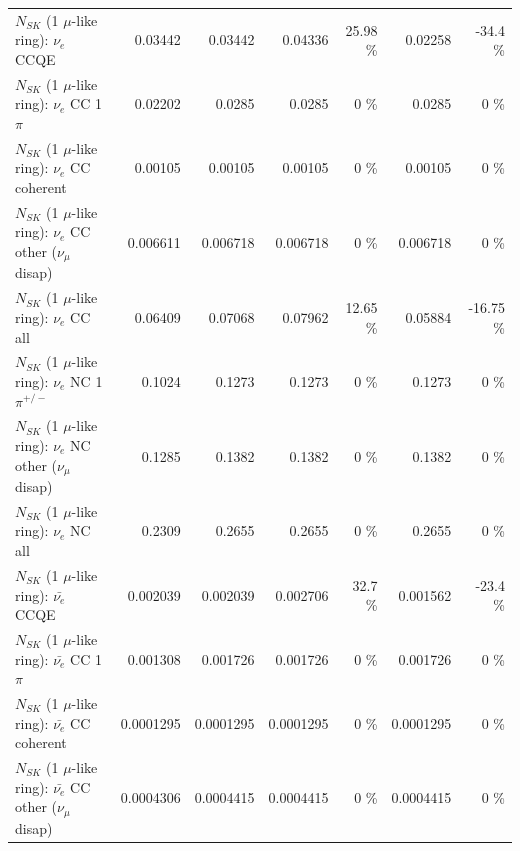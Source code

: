 \begin{table}
\begin{tabular}{| l | r | r | r  r | r  r |}
\hline
\hline
\hline
                                      $N_{SK}$ (1 $\mu$-like ring): $\nu_e$ CCQE &         0.03442 &         0.03442 &         0.04336 &    25.98 \%  &         0.02258 &    -34.4 \%  \\ 
                                 $N_{SK}$ (1 $\mu$-like ring): $\nu_e$ CC 1$\pi$ &         0.02202 &          0.0285 &          0.0285 &        0 \%  &          0.0285 &        0 \%  \\ 
                               $N_{SK}$ (1 $\mu$-like ring): $\nu_e$ CC coherent &         0.00105 &         0.00105 &         0.00105 &        0 \%  &         0.00105 &        0 \%  \\ 
                $N_{SK}$ (1 $\mu$-like ring): $\nu_e$ CC other ($\nu_\mu$ disap) &        0.006611 &        0.006718 &        0.006718 &        0 \%  &        0.006718 &        0 \%  \\ 
                                  $N_{SK}$ (1 $\mu$-like ring): $\nu_{e}$ CC all &         0.06409 &         0.07068 &         0.07962 &    12.65 \%  &         0.05884 &   -16.75 \%  \\ 
\hline
                           $N_{SK}$ (1 $\mu$-like ring): $\nu_e$ NC 1$\pi^{+/-}$ &          0.1024 &          0.1273 &          0.1273 &        0 \%  &          0.1273 &        0 \%  \\ 
                $N_{SK}$ (1 $\mu$-like ring): $\nu_e$ NC other ($\nu_\mu$ disap) &          0.1285 &          0.1382 &          0.1382 &        0 \%  &          0.1382 &        0 \%  \\ 
                                  $N_{SK}$ (1 $\mu$-like ring): $\nu_{e}$ NC all &          0.2309 &          0.2655 &          0.2655 &        0 \%  &          0.2655 &        0 \%  \\ 
\hline
\hline
\hline
                                $N_{SK}$ (1 $\mu$-like ring): $\bar{\nu_e}$ CCQE &        0.002039 &        0.002039 &        0.002706 &     32.7 \%  &        0.001562 &    -23.4 \%  \\ 
                           $N_{SK}$ (1 $\mu$-like ring): $\bar{\nu_e}$ CC 1$\pi$ &        0.001308 &        0.001726 &        0.001726 &        0 \%  &        0.001726 &        0 \%  \\ 
                         $N_{SK}$ (1 $\mu$-like ring): $\bar{\nu_e}$ CC coherent &       0.0001295 &       0.0001295 &       0.0001295 &        0 \%  &       0.0001295 &        0 \%  \\ 
          $N_{SK}$ (1 $\mu$-like ring): $\bar{\nu_e}$ CC other ($\nu_\mu$ disap) &       0.0004306 &       0.0004415 &       0.0004415 &        0 \%  &       0.0004415 &        0 \%  \\ 

\end{tabular}
\end{table}

